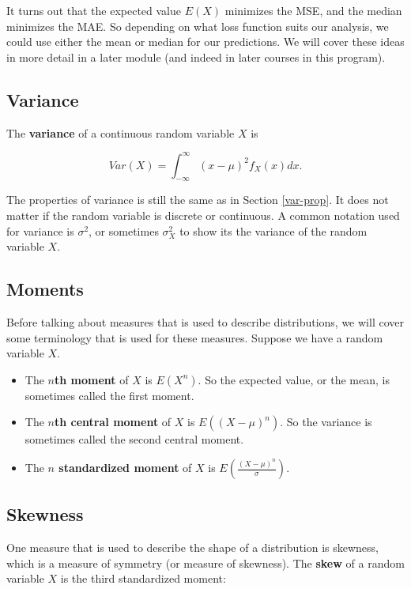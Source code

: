 \documentclass[
]{book}
\providecommand{\tightlist}{%
  \setlength{\itemsep}{0pt}\setlength{\parskip}{0pt}}
\begin{document}
It turns out that the expected value \(E(X)\) minimizes the MSE, and the median minimizes the MAE. So depending on what loss function suits our analysis, we could use either the mean or median for our predictions. We will cover these ideas in more detail in a later module (and indeed in later courses in this program).

\subsection{Variance}\label{variance-1}

The \textbf{variance} of a continuous random variable \(X\) is

\begin{equation} 
Var(X) = \int_{-\infty}^{\infty} (x-\mu)^2 f_X(x) dx.
\label{eq:4-var}
\end{equation}

The properties of variance is still the same as in Section \ref{var-prop}. It does not matter if the random variable is discrete or continuous. A common notation used for variance is \(\sigma^2\), or sometimes \(\sigma_X^2\) to show its the variance of the random variable \(X\).

\subsection{Moments}\label{moments}

Before talking about measures that is used to describe distributions, we will cover some terminology that is used for these measures. Suppose we have a random variable \(X\).

\begin{itemize}
\tightlist
\item
  The \textbf{\(n\)th moment} of \(X\) is \(E(X^n)\). So the expected value, or the mean, is sometimes called the first moment.
\item
  The \textbf{\(n\)th central moment} of \(X\) is \(E((X-\mu)^n)\). So the variance is sometimes called the second central moment.
\item
  The \textbf{\(n\) standardized moment} of \(X\) is \(E(\frac{(X-\mu)^n}{\sigma})\).
\end{itemize}

\subsection{Skewness}\label{skewness}

One measure that is used to describe the shape of a distribution is skewness, which is a measure of symmetry (or measure of skewness). The \textbf{skew} of a random variable \(X\) is the third standardized moment:
\end{document}
